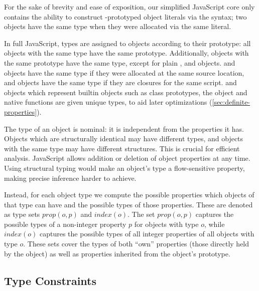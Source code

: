 For the sake of brevity and ease of exposition, our simplified JavaScript core
only contains the ability to construct -prototyped object
literals via the \code{\{\}} syntax;
two objects have the same type when they were allocated via the same literal.

In full JavaScript, types are assigned to objects according to their prototype:
all objects with the same type have the same prototype.
Additionally, objects with the same prototype have the same type,
except for plain ,  and  objects.
 and  objects have the same type if they were
allocated at the same source location,
and  objects have the same type if they are closures
for the same script.
 and  objects which represent builtin objects
such as class prototypes, the  object and native functions
are given unique types, to aid later optimizations
(\Section\ref{sec:definite-properties}).

The type of an object is nominal: it is independent from the properties it
has. Objects which are structurally identical may have different types, and
objects with the same type may have different structures. This is crucial for
efficient analysis. JavaScript allows addition or deletion of object properties
at any time. Using structural typing would make an object's type a
flow-sensitive property, making precise inference harder to achieve.

Instead, for each object type we compute the possible properties which
objects of that type can have and the possible types of those properties.
These are denoted as type sets $\mathit{prop}(o,p)$ and
$\mathit{index}(o)$. The set $\mathit{prop}(o,p)$ captures the possible types
of a non-integer property $p$ for objects with type $o$, while
$\mathit{index}(o)$ captures the possible types of all integer properties of
all objects with type $o$.
These sets cover the types of both ``own'' properties (those directly held
by the object) as well as properties inherited from the object's prototype.

\subsection{Type Constraints}
\label{sec:constraints}

